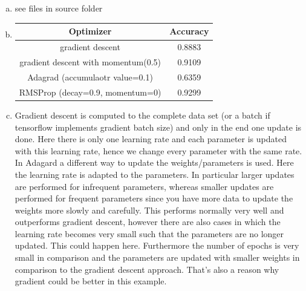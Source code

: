 \documentclass[12pt]{article}
\begin{document}

\setcounter{section}{7}
\setcounter{subsection}{0}

\subsection{ }
\begin{enumerate}[a)]
	\item see files in source folder
	
	\item 
		\begin{tabular}{|c|c|}
			\hline
 		 	Optimizer & Accuracy \\
 		 	\hline
 		 	gradient descent & 0.8883 \\
 		 	\hline
 		 	gradient descent with momentum(0.5) & 0.9109 \\
 		 	\hline
 		 	Adagrad (accumulaotr value=0.1) & 0.6359\\
 		 	\hline
 		 	RMSProp (decay=0.9, momentum=0) & 0.9299 \\
 		 	\hline
 		\end{tabular}
 		
 	\item 
 	Gradient descent is computed to the complete data set (or a batch if tensorflow implements gradient batch size) and only in the end one update is done. Here there is only one learning rate and each parameter is updated with this learning rate, hence we change every parameter with the same rate.\\
 	In Adagard a different way to update the weights/parameters is used. Here the learning rate is adapted to the parameters. In particular larger updates are performed for infrequent parameters, whereas smaller updates are performed for frequent parameters since you have more data to update the weights more slowly and carefully. This performs normally very well and outperforms gradient descent, however there are also cases in which the learning rate becomes very small such that the parameters are no longer updated. This could happen here. Furthermore the number of epochs is very small in comparison and the parameters are updated with smaller weights in comparison to the gradient descent approach. That's also a reason why gradient could be better in this example.\\
\end{enumerate}
\end{document}
